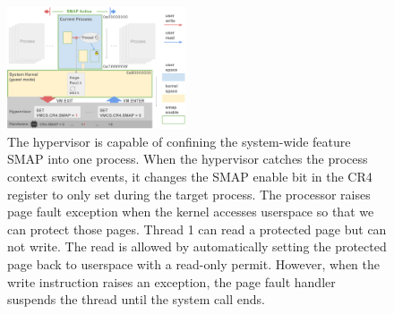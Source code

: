 \begin{figure}[th]
  \includegraphics[width=0.47\textwidth]{figures/ktoctou-overview2}
  \centering
  \caption{The hypervisor is capable of confining the system-wide feature SMAP into one process. When the hypervisor catches the process context switch events, it changes the SMAP enable bit in the CR4 register to only set during the target process. The processor raises page fault exception when the kernel accesses userspace so that we can protect those pages. Thread 1 can read a protected page but can not write. The read is allowed by automatically setting the protected page back to userspace with a read-only permit. However, when the write instruction raises an exception, the page fault handler suspends the thread until the system call ends.}
  \label{fig:ktoctou-overview}
\end{figure}
